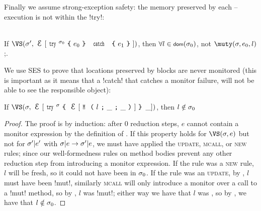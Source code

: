 Finally we assume strong-exception safety: the memory preserved by each \Q@try@--\Q@catch@ execution is not \muty within the \Q!try!:%
\SS\begin{Assumption}\rm\ \\
\indent If $\VS(\s', \E[\Kw{try}^{\s_0}\oC e_0\cC\ \Kw{catch}\ \oC e_1\cC])$, then $\forall l \in \dom(\s_0)$, not $\muty(\s, e_0, l)$;.
\end{Assumption}

We use SES to prove that locations preserved by \Q@try@ blocks are never monitored (this is important as it means that a \Q!catch! that catches a monitor failure, will not be able to see the responsible object):%
\SS\begin{Lemma}\rm
	If $\VS(\s, \E[\Kw{try}^\s\oC\E[\M{l}{\_}{\_}]\cC\,\_])$, then $l\notin\sigma_0$
\end{Lemma}\SS
\begin{proof}
The proof is by induction: after 0 reduction steps, $e$ cannot contain a monitor expression by the definition of \VS. If this property holds for $\VS(\s, e)$ but not for $\sigma'|e'$ with $\sigma|e\rightarrow \sigma'|e$, we must have applied the \textsc{update}, \textsc{mcall}, or \textsc{new} rules; since our well-formedness rules on method bodies prevent any other reduction step from introducing a monitor expression. If the rule was a \textsc{new} rule, $l$ will be fresh, so it could not have been in $\sigma_0$. If the rule was an \textsc{update}, by , $l$ must have been \Q!mut!, similarly \textsc{mcall} will only introduce a monitor over a call to a \Q!mut! method, so by , $l$ was \Q!mut!; either way we have that $l$ was \muty, so by , we have that $l \notin \sigma_0$.
\end{proof}

